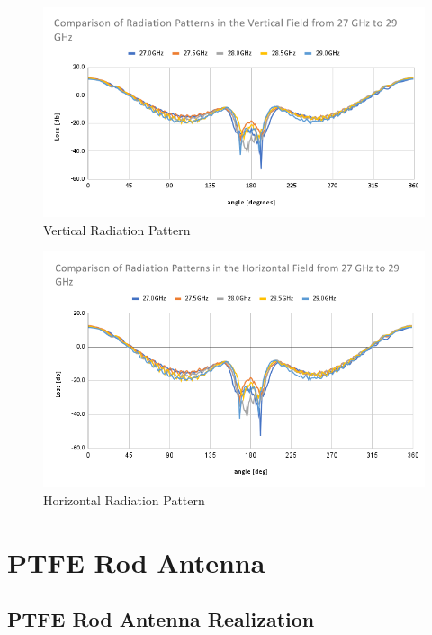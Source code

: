 \documentclass[a4paper,12pt]{report}
\begin{document}
\begin{figure}
  \begin{center}
    \includegraphics[clip, keepaspectratio, width=0.9\linewidth]{img/radiation_pattern_comparison_27_29_vertical.png}
    \caption{Vertical Radiation Pattern}
    \label{fig:radiation_pattern_comparison_27_29_vertical} 
  \end{center}
\end{figure}

\begin{figure}
  \begin{center}
    \includegraphics[clip, keepaspectratio, width=0.9\linewidth]{img/radiation_pattern_comparison_27_29_horizontal.png}
    \caption{Horizontal Radiation Pattern}
    \label{img:radiation_pattern_comparison_27_29_horizontal}
  \end{center}
\end{figure}

\chapter{PTFE Rod Antenna}

\section{PTFE Rod Antenna Realization}
\end{document}
